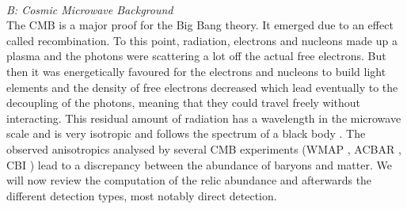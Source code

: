 \\ \textit{B: Cosmic Microwave Background}\\
\noindent The CMB is a major proof for the Big Bang theory. It emerged due to an effect called recombination. 
To this point, radiation, electrons and nucleons made up a plasma and the photons were scattering a lot off the actual free electrons. But then it was 
energetically favoured for the electrons and nucleons to build light elements and the density of free electrons decreased which lead eventually to the decoupling
of the photons, meaning that they could travel freely without interacting. This residual amount of radiation has a wavelength in the microwave scale and is
very isotropic and follows the spectrum of a black body \cite{DM-EvCaDo}. The observed anisotropics analysed by several CMB experiments 
(WMAP \cite{1212.5226}, ACBAR \cite{0303515}, CBI \cite{0205388}) lead to a discrepancy
between the abundance of baryons and matter. We will now review the computation of the relic abundance and afterwards the different detection types, most 
notably direct detection.

